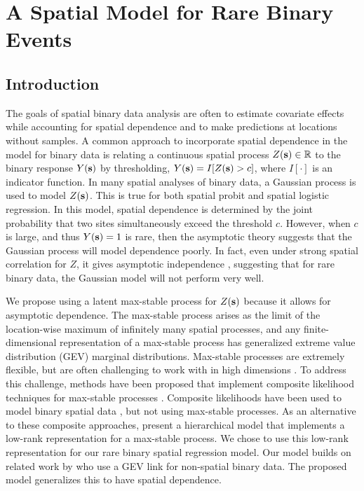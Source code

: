 \chapter{A Spatial Model for Rare Binary Events}
\label{chap:three}

\section{Introduction}\label{rbs:intro}

The goals of spatial binary data analysis are often to estimate covariate effects while accounting for spatial dependence and to make predictions at locations without samples.
A common approach to incorporate spatial dependence in the model for binary data is relating a continuous spatial process $Z(\mathbf{s}) \in \mathbb{R}$ to the binary response $Y(\mathbf{s})$ by thresholding, $Y(\mathbf{s}) = I[Z(\mathbf{s}) > c]$, where $I[\cdot]$ is an indicator function.
In many spatial analyses of binary data, a Gaussian process is used to model $Z(\mathbf{s})$.
This is true for both spatial probit and spatial logistic regression.
In this model, spatial dependence is determined by the joint probability that two sites simultaneously exceed the threshold $c$.
However, when $c$ is large, and thus $Y(\mathbf{s}) = 1$ is rare, then the asymptotic theory suggests that the Gaussian process will model dependence poorly.
In fact, even under strong spatial correlation for $Z$, it gives asymptotic independence \citep{Sibuya1960}, suggesting that for rare binary data, the Gaussian model will not perform very well.

We propose using a latent max-stable process \citep{deHaan1984} for $Z(\mathbf{s})$ because it allows for asymptotic dependence.
The max-stable process arises as the limit of the location-wise maximum of infinitely many spatial processes, and any finite-dimensional representation of a max-stable process has generalized extreme value distribution (GEV) marginal distributions.
Max-stable processes are extremely flexible, but are often challenging to work with in high dimensions \citep{Wadsworth2014,Thibaud2013a}.
To address this challenge, methods have been proposed that implement composite likelihood techniques for max-stable processes \citep{Padoan2010,Genton2011,Huser2014}.
Composite likelihoods have been used to model binary spatial data \citep{Heagerty1998}, but not using max-stable processes.
As an alternative to these composite approaches, \citet{Reich2012} present a hierarchical model that implements a low-rank representation for a max-stable process.
We chose to use this low-rank representation for our rare binary spatial regression model.
Our model builds on related work by \citet{Wang2010} who use a GEV link for non-spatial binary data.
The proposed model generalizes this to have spatial dependence. 

